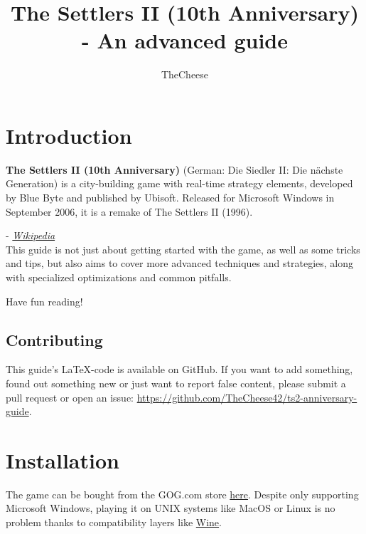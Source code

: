 \documentclass[12pt]{article}
\title{\titlefont The Settlers II (10th Anniversary) - An advanced guide}
\author{TheCheese}
\date{}
\begin{document}
\maketitle

\vspace{2cm}

\begingroup
  \hypersetup{hidelinks}
  \tableofcontents
\endgroup


\section{Introduction}
\label{sec:introduction}

\begin{displayquote}
\textbf{The Settlers II (10th Anniversary)} (German: Die Siedler II: Die nächste Generation) is a city-building game with real-time strategy elements, developed by Blue Byte and published by Ubisoft. Released for Microsoft Windows in September 2006, it is a remake of The Settlers II (1996).
\end{displayquote}
\hspace{2cm}- \textit{\href{https://en.wikipedia.org/wiki/The_Settlers_II_(10th_Anniversary)}{Wikipedia}}\\

This guide is not just about getting started with the game, as well as some tricks and tips, but also aims to cover more advanced techniques and strategies, along with specialized optimizations and common pitfalls.

Have fun reading!

\subsection{Contributing}
\label{sec:contributing}

This guide's \LaTeX-code is available on GitHub. If you want to add something, found out something new or just want to report false content, please submit a pull request or open an issue: \url{https://github.com/TheCheese42/ts2-anniversary-guide}.

\section{Installation}
\label{sec:installation}

The game can be bought from the GOG.com store \href{https://www.gog.com/en/game/the_settlers_2_10th_anniversary}{here}. Despite only supporting Microsoft Windows, playing it on UNIX systems like MacOS or Linux is no problem thanks to compatibility layers like \href{https://www.winehq.org}{Wine}.
\end{document}
